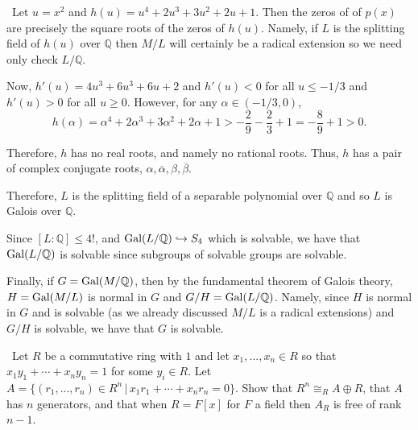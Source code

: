 \documentclass[12pt]{AlgebraQual}
\begin{document}
\begin{solution}$\,$
Let $u=x^2$ and $h(u)=u^4+2u^3+3u^2+2u+1$. Then the zeros of of $p(x)$ are precisely the square roots of the zeros of $h(u)$. Namely, if $L$ is the splitting field of $h(u)$ over $\mathbb{Q}$ then $M/L$ will certainly be a radical extension so we need only check $L/\mathbb{Q}.$

Now, $h'(u)=4u^3+6u^3+6u+2$ and $h'(u)<0$ for all $u\le -1/3$ and $h'(u)>0$ for all $u\ge0$. However, for any $\alpha\in(-1/3,0)$, $$h(\alpha)=\alpha^4+2\alpha^3+3\alpha^2+2\alpha+1>-\frac{2}{9}-\frac{2}{3}+1=-\frac{8}{9}+1>0.$$

Therefore, $h$ has no real roots, and namely no rational roots. Thus, $h$ has a pair of complex conjugate roots, $\alpha,\overline{\alpha},\beta,\overline{\beta}$.

Therefore, $L$ is the splitting field of a separable polynomial over $\mathbb{Q}$ and so $L$ is Galois over $\mathbb{Q}$.

Since $[L:\mathbb{Q}]\le 4!$, and $\text{Gal}(L/\mathbb{Q})\hookrightarrow S_4$ which is solvable, we have that $\text{Gal}(L/\mathbb{Q})$ is solvable since subgroups of solvable groups are solvable.

Finally, if $G=\text{Gal}(M/\mathbb{Q})$, then by the fundamental theorem of Galois theory, $H=\text{Gal}(M/L)$ is normal in $G$ and $G/H=\text{Gal}(L/\mathbb{Q})$. Namely, since $H$ is normal in $G$ and is solvable (as we already discussed $M/L$ is a radical extensions) and $G/H$ is solvable, we have that $G$ is solvable.
\end{solution}
\newpage




\begin{problem} $\,$
Let $R$ be a commutative ring with $1$ and let $x_1,...,x_n\in R$ so that $x_1y_1+\cdots+x_ny_n=1$ for some $y_i\in R.$ Let $A=\{(r_1,...,r_n)\in R^n\,|\,x_1r_1+\cdots+x_nr_n=0\}.$ Show that $R^n\cong_RA\oplus R$, that $A$ has $n$ generators, and that when $R=F[x]$ for $F$ a field then $A_R$ is free of rank $n-1$.
\end{problem}
\end{document}
